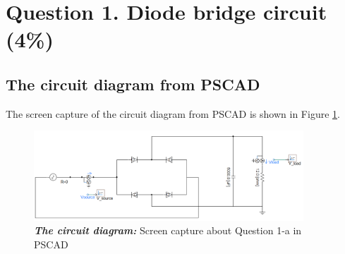 \documentclass[12pt]{report} %
\begin{document}
\listoftables 
{} 
\newpage



\section{Question 1. Diode bridge circuit (4\%)} 
\subsection{The circuit diagram from PSCAD} 
The screen capture of the circuit diagram from PSCAD is shown in Figure \ref{fig:Q1circuitdiagram}. 
\begin{figure}[H] %
    \centering %
    \includegraphics[width=0.9\textwidth]{Image/Q1/Q1_circuit.PNG} 
    \caption[The screen capture of your circuit diagram from PSCAD]
    {\centering \textit{\textbf{The circuit diagram:}} Screen capture about Question 1-a in PSCAD}
    \label{fig:Q1circuitdiagram}
\end{figure} %
\end{document}
